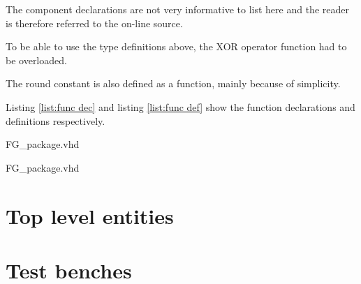\documentclass[report.tex]{subfiles}
\begin{document}
The component declarations are not very informative to list here and the reader is therefore referred to the on-line source.

To be able to use the type definitions above, the XOR operator function had to be overloaded.

The round constant is also defined as a function, mainly because of simplicity.

Listing \ref{list:func dec} and listing \ref{list:func def} show the function declarations and definitions respectively.


{FG_package.vhd}


{FG_package.vhd}

\section{Top level entities}

\section{Test benches}
\end{document}
